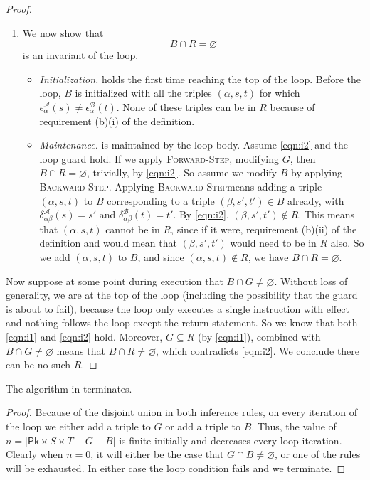 \documentclass[acmsmall,dvipsnames,nonacm]{acmart}
\newcommand\Pk{\mathsf{Pk}}
\newcommand\pk{\alpha}
\newcommand\pkp{\beta}
\newcommand\Fwd{\textsc{Forward-Step}}
\newcommand\Bkwd{\textsc{Backward-Step}}
\newcommand\A{\mathcal{A}}
\newcommand\B{\mathcal{B}}
\newcommand\epsA{\epsilon^\A_\pk}
\newcommand\epsB{\epsilon^\B_\pk}
\newcommand\delA{\delta^\A_{\pk\pkp}}
\newcommand\delB{\delta^\B_{\pk\pkp}}
\begin{document}
\begin{proof}
\begin{enumerate}
    \item We now show that
      \begin{equation}
        \tag{I2}\label{eqn:i2}
        B \cap R = \varnothing
      \end{equation}
      is an invariant of the loop.
      \begin{itemize}
        \item \emph{Initialization.}  holds the first time reaching the top of the loop.
          Before the loop, $B$ is initialized with all the triples $(\pk, s,t)$ for which
          $\epsA(s) \neq \epsB(t)$. None of these triples can be in $R$ because of
          requirement (b)(i) of the definition.
        \item \emph{Maintenance.}  is maintained by the loop body.
          Assume \ref{eqn:i2} and the loop guard hold. If we apply \Fwd,
          modifying $G$, then $B\cap R =\varnothing$, trivially, by
          \ref{eqn:i2}. So assume we modify $B$ by applying \Bkwd. Applying
          \Bkwd means adding a triple $(\pk,s,t)$ to $B$ corresponding to a
          triple $(\pkp, s', t')\in B$ already, with $\delA(s)=s'$ and
          $\delB(t)=t'$. By \ref{eqn:i2}, $(\pkp, s',t')\notin R$. This means
          that $(\pk, s, t)$ cannot be in $R$, since if it were, requirement
          (b)(ii) of the definition and would mean that $(\pkp, s', t')$ would
          need to be in $R$ also. So we add $(\pk, s,t)$ to $B$, and since
          $(\pk,s,t)\notin R$, we have $B\cap R = \varnothing$.
      \end{itemize}
  \end{enumerate}
  Now suppose at some point during execution that $B \cap G \neq \varnothing$.
  Without loss of generality, we are at the top of the loop (including the
  possibility that the guard is about to fail), because the loop only executes
  a single instruction with effect and nothing follows the loop except the
  return statement. So we know that both \ref{eqn:i1} and \ref{eqn:i2} hold.
  Moreover, $G \subseteq R$ (by \ref{eqn:i1}), combined with $B\cap G \neq
  \varnothing$ means that $B \cap R \neq \varnothing$, which contradicts
  \ref{eqn:i2}. We conclude there can be no such $R$.
\end{proof}

\begin{lemma}\label{lem:termination}
The algorithm in  terminates.
\end{lemma}
\begin{proof}
Because of the disjoint union in both inference rules, on every iteration of the
loop we either add a triple to $G$ or add a triple to $B$. Thus, the value
of $n = |\Pk\times S\times T - G - B|$ is finite initially and decreases every
loop iteration. Clearly when $n = 0$, it will either be the case that $G \cap B
\neq \varnothing$, or one of the rules will be exhausted. In either case the
loop condition fails and we terminate.
\end{proof}
\end{document}
